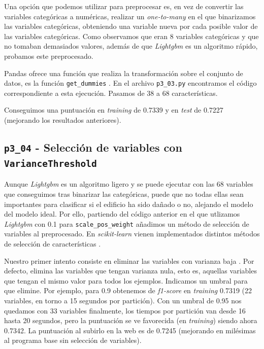 \documentclass[a4paper, 20pt]{article}
\begin{document}
Una opción que podemos utilizar para preprocesar es, en vez de convertir las variables categóricas a numéricas, realizar un \textit{one-to-many} en el que binarizamos las variables categóricas, obteniendo una variable nueva por cada posible valor de las variables categóricas. Como observamos que eran 8 variables categóricas y que no tomaban demasiados valores, además de que \textit{Lightgbm} es un algoritmo rápido, probamos este preprocesado. 

Pandas ofrece una función que realiza la transformación sobre el conjunto de datos, es la función \texttt{get\_dummies} \cite{noauthor_pandas.get_dummies_nodate}. En el archivo \texttt{p3\_03.py} encontramos el código correspondiente a esta ejecución. Pasamos de 38 a 68 características.

Conseguimos una puntuación en \textit{training} de 0.7339 y en \textit{test} de 0.7227 (mejorando los resultados anteriores).

\subsection{\texttt{p3\_04} - Selección de variables con \texttt{VarianceThreshold}}

Aunque \textit{Lightgbm} es un algoritmo ligero y se puede ejecutar con las 68 variables que conseguimos tras binarizar las categóricas, puede que no todas ellas sean importantes para clasificar si el edificio ha sido dañado o no, alejando el modelo del modelo ideal. Por ello, partiendo del código anterior en el que utlizamos \textit{Lightgbm} con 0.1 para \texttt{scale\_pos\_weight} añadimos un método de selección de variables al preprocesado. En \textit{scikit-learn} vienen implementados distintos métodos de selección de características \cite{noauthor_1.13._nodate}.

Nuestro primer intento consiste en eliminar las variables con varianza baja \cite{noauthor_sklearn.feature_selection.variancethreshold_nodate}. Por defecto, elimina las variables que tengan varianza nula, esto es, aquellas variables que tengan el mismo valor para todos los ejemplos. Indicamos un umbral para que elimine. Por ejemplo, para 0.9 obtenemos de \textit{f1-score} en \textit{training} 0.7319 (22 variables, en torno a 15 segundos por partición). Con un umbral de 0.95 nos quedamos con 33 variables finalmente, los tiempos por partición van desde 16 hasta 20 segundos, pero la puntuación se ve favorecida (en \textit{training}) siendo ahora 0.7342. La puntuación al subirlo en la web es de 0.7245 (mejorando en milésimas al programa base sin selección de variables).
\end{document}
